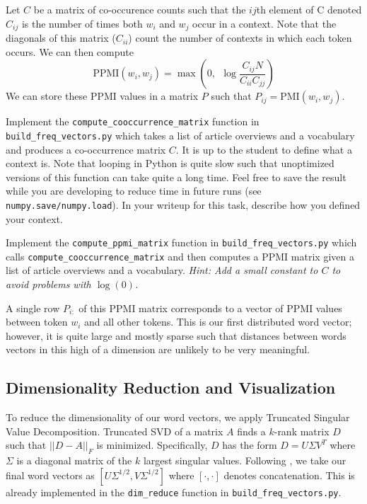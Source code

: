 \documentclass[a4paper,10pt]{article}
\begin{document}
Let $C$ be a matrix of co-occurence counts such that the $ij$th element of C  denoted $C_{ij}$ is the number of times both $w_i$ and $w_j$ occur in a context. Note that the diagonals  of this matrix ($C_{ii}$) count the number of contexts in which each token occurs. We can then compute
%
\begin{equation}
    \mbox{PPMI}(w_i,w_j) = \max\left(0,~~\log\frac{C_{ij}N}{C_{ii}C_{jj}}\right)
\end{equation}
%
We can store these PPMI values in a matrix $P$ such that $P_{ij} = \mbox{PMI}(w_i, w_j)$. 

\vspace{5pt}
\begin{taskbox}
 Implement the \texttt{compute\_cooccurrence\_matrix} function in \texttt{build\_freq\_vectors.py} which takes a list of article overviews and a vocabulary and produces a co-occurrence matrix $C$. It is up to the student to define what a context is. Note that looping in Python is quite slow such that unoptimized versions of this function can take quite a long time. Feel free to save the result while you are developing to reduce time in future runs (see \texttt{numpy.save/numpy.load}). In your writeup for this task, describe how you defined your context.

 Implement the \texttt{compute\_ppmi\_matrix} function in \texttt{build\_freq\_vectors.py} which calls \texttt{compute\_cooccurrence\_matrix} and then computes a PPMI matrix given a list of article overviews and a vocabulary.  \emph{Hint: Add a small constant to $C$ to avoid problems with $\log(0)$.}
\end{taskbox}
\vspace{5pt}


 A single row $P_{i:}$ of this PPMI matrix corresponds to a vector of PPMI values between token $w_i$ and all other tokens. This is our first distributed word vector; however, it is quite large and mostly sparse such that distances between words vectors in this high of a dimension are unlikely to be very meaningful. 


\subsection{Dimensionality Reduction and Visualization}

 To reduce the dimensionality of our word vectors, we apply Truncated Singular Value Decomposition. Truncated SVD of a matrix $A$ finds a $k$-rank matrix $D$ such that $||D-A||_F$ is minimized. Specifically, $D$ has the form $D=U\Sigma V^T$ where $\Sigma$ is a diagonal matrix of the $k$ largest singular values. Following \cite{levy2014neural}, we take our final word vectors as $[U\Sigma^{1/2}, V\Sigma^{1/2}]$ where $[\cdot, \cdot]$ denotes concatenation. This is already implemented in the \texttt{dim\_reduce} function in \texttt{build\_freq\_vectors.py}.
\end{document}

